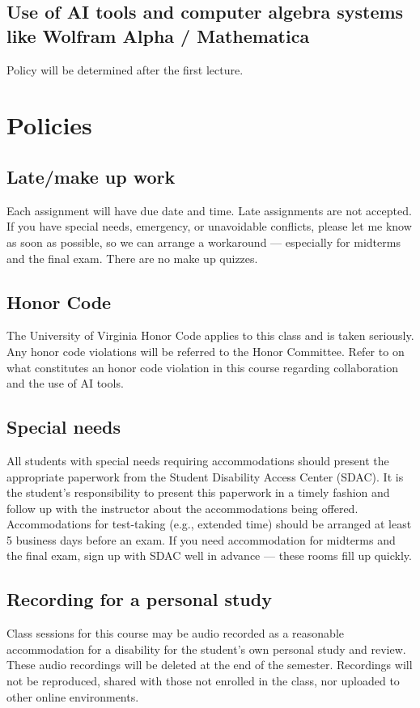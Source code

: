 \documentclass[oneside,11pt]{amsart}
\begin{document}
\subsection{Use of AI tools and computer algebra systems like Wolfram Alpha / Mathematica} 
\label{AI_tools}

Policy will be determined after the first lecture.


\section{Policies}

\subsection{Late/make up work}
Each assignment will have due date and time. Late assignments are not accepted. If you have special needs, emergency, or unavoidable conflicts, please let me know as soon as possible, so we can arrange a workaround --- especially for midterms and the final exam. There are no make up quizzes.

\subsection{Honor Code}
The University of Virginia Honor Code applies to this class and is taken seriously. Any honor code violations will be referred to the Honor Committee. Refer to  on what constitutes an honor code violation in this course regarding collaboration and the use of AI tools.

\subsection{Special needs}

All students with special needs requiring accommodations should present the appropriate paperwork from the Student Disability Access Center (SDAC). It is the student's responsibility to present this paperwork in a timely fashion and follow up with the instructor about the accommodations being offered. Accommodations for test-taking (e.g., extended time) should be arranged at least 5 business days before an exam. 
If you need accommodation for midterms and the final exam, sign up with SDAC well in advance --- these rooms fill up quickly.

\subsection{Recording for a personal study}

Class sessions for this course may be audio recorded as a
reasonable accommodation for a disability for the student’s
own personal study and review. These audio recordings will
be deleted at the end of the semester. Recordings will not
be reproduced, shared with those not enrolled in the class,
nor uploaded to other online environments.
\end{document}
